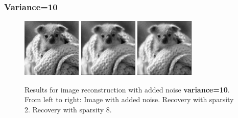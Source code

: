 \documentclass{article}
\begin{document}
\subsubsection*{Variance=10}
\begin{figure}[h]
    \captionsetup{width=.5\linewidth}
    \centering
        \includegraphics[width=0.25\textwidth]{images/koala_noise-10.png}
        \includegraphics[width=0.25\textwidth]{images/koala_noise-10-recovered_02.png}
        \includegraphics[width=0.25\textwidth]{images/koala_noise-10-recovered_08.png}
        \caption{Results for image reconstruction with added noise {\bf variance=10}. From left to right: Image with added noise. Recovery with sparsity 2. Recovery with sparsity 8.}
\end{figure}


\newpage
\end{document}
